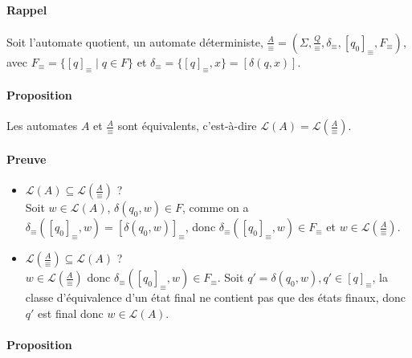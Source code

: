 \paragraph{Rappel} %
\label{par:rappel}

Soit l'automate quotient, un automate déterministe, $\frac{A}{\equiv}=(\Sigma,\frac{Q}{\equiv},\delta_{\equiv},[q_0]_{\equiv},F_{\equiv})$, avec $F_{\equiv}=\{[q]_{\equiv} \mid q \in F\}$ et $\delta_{\equiv}=\{[q]_{\equiv},x\}=[\delta(q,x)]$.



\paragraph{Proposition} %
\label{par:proposition}

Les automates $A$ et $\frac{A}{\equiv}$ sont équivalents, c'est-à-dire $\mathcal{L}(A)=\mathcal{L}(\frac{A}{\equiv})$.



\paragraph{Preuve} %
\label{par:preuve}

\begin{itemize}
	\item $\mathcal{L}(A) \subseteq \mathcal{L}(\frac{A}{\equiv})$ ?\\
	Soit $w \in \mathcal{L}(A)$, $\delta(q_0,w) \in F$, comme on a $\delta_{\equiv}([q_0]_{\equiv},w) = [\delta(q_0,w)]_{\equiv}$, donc $\delta_{\equiv}([q_0]_{\equiv},w) \in F_{\equiv}$ et $w \in \mathcal{L}(\frac{A}{\equiv})$.
	\item $\mathcal{L}(\frac{A}{\equiv}) \subseteq \mathcal{L}(A)$ ?\\
	$w \in \mathcal{L}(\frac{A}{\equiv})$ donc $\delta_{\equiv}([q_0]_{\equiv},w) \in F_{\equiv}$. Soit $q'=\delta(q_0,w), q'\in [q]_{\equiv}$, la classe d'équivalence d'un état final ne contient pas que des états finaux, donc $q'$ est final donc $w \in \mathcal{L}(A)$.
\end{itemize}



\paragraph{Proposition} %
\label{par:proposition}

